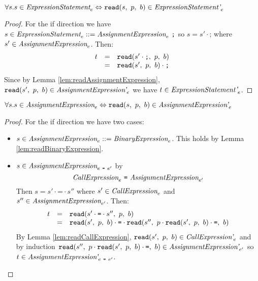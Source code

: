 \documentclass[preprint,10pt]{sigplanconf}
\begin{document}
\begin{lemma}\mbox{}
  
  \( \forall s. s \in \textit{ExpressionStatement}_{e} \Leftrightarrow 
  \texttt{read}(s,~p,~b) \in \textit{ExpressionStatement'}_{e} \)
\end{lemma}
\begin{proof}
  For the if direction we have 
  \( s \in \textit{ExpressionStatement}_{e} ::=
  \textit{AssignmentExpression}_{e}~\texttt{;} \) so \( s = s' \cdot
  \texttt{;} \) where \( s' \in \textit{AssignmentExpression}_{e} \).
  Then:
  \[
  \begin{array}{rcl}
    t &=& \texttt{read}(s'\cdot \texttt{;},~p,~b)
    \\
    &=& \texttt{read}(s',~p,~b) \cdot \texttt{;}
  \end{array}
  \]
  Since by Lemma \ref{lem:readAssignmentExpression}, \(
  \texttt{read}(s',~p,~b) \in \textit{AssignmentExpression'}_{e} \) we have
  \( t \in \textit{ExpressionStatement'}_{e} \).
\end{proof}

\begin{lemma}\mbox{}
  
  \( \forall s. s \in \textit{AssignmentExpression}_{e} \Leftrightarrow 
  \texttt{read}(s,~p,~b) \in \textit{AssignmentExpression'}_{e} \)
\end{lemma}
\begin{proof}
  For the if direction we have two cases:
  \begin{itemize}
  \item \( s \in \textit{AssignmentExpression}_{e} ::=
    \textit{BinaryExpression}_{e} \). This holds by Lemma
    \ref{lem:readBinaryExpression}.
    
  \item \( s \in \textit{AssignmentExpression}_{e~\texttt{=}~e'} \) by
    \[ 
    \textit{CallExpression}_{e} ~\texttt{=}~
    \textit{AssignmentExpression}_{e'} 
    \]
    Then \( s = s' \cdot \texttt{=} \cdot s'' \) where \( s' \in
    \textit{CallExpression}_{e} \) and \( s'' \in
    \textit{AssignmentExpression}_{e'} \). Then:
    \[
    \begin{array}{rcl}
      t &=& \texttt{read}(s' \cdot \texttt{=} \cdot s'',~p,~b)
      \\
      &=& \texttt{read}(s',~p,~b) \cdot \texttt{=} \cdot
      \texttt{read}(s'',~p \cdot \texttt{read}(s',~p,~b) \cdot \texttt{=},~b)
    \end{array}
    \]
    By Lemma \ref{lem:readCallExpression}, \( \texttt{read}(s',~p,~b) \in
    \textit{CallExpression'}_{e} \) and by induction \( \texttt{read}(s'',~p
      \cdot \texttt{read}(s',~p,~b) \cdot \texttt{=},~b) \in
    \textit{AssignmentExpression'}_{e'} \) so \( t \in
    \textit{AssignmentExpression'}_{e~\texttt{=}~e'} \).
  \end{itemize}
\end{proof}
\end{document}
